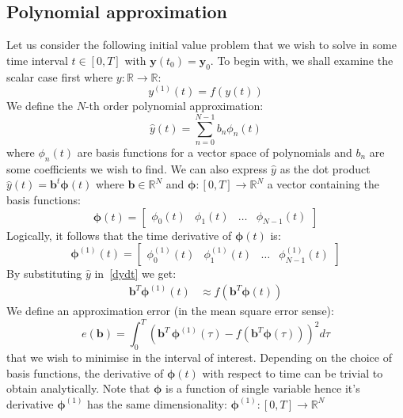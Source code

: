 \documentclass[11pt]{report}
\begin{document}
    \subsection{Polynomial approximation}
    Let us consider the following initial value problem that we wish to solve in some time interval
    $t \in [0 , T]$ with $\pmb{y} (t_0)= \pmb{y}_0$.
    To begin with, we shall examine the scalar case first where $y : \mathbb{R} \to \mathbb{R}$:
    \begin{equation}
        y^{(1)}(t) = f(y(t)) \label{dydt}
    \end{equation}
    We define the $N$-th order polynomial approximation:
    \begin{equation*}
        \hat{y}(t)=\sum_{n=0}^{N-1} b_n \phi_n(t)
    \end{equation*}
    where $ \phi_n(t) $ are basis functions for a vector space of polynomials and $b_n$ are some coefficients we wish to find.
    We can also express $\hat{y}$ as the dot product $\hat{y}(t)=  \pmb{b}^t \pmb{\phi}(t)$ where $\pmb{b} \in \mathbb{R}^N$ and
    $\pmb{\phi} : [0,T] \to \mathbb{R}^N$ a vector containing the basis functions:
    \begin{equation*}
        \pmb{\phi}(t) =
        \begin{bmatrix}
            \phi_0(t) & \phi_1(t) & \dots & \phi_{N-1}(t)
        \end{bmatrix}
    \end{equation*}
    Logically, it follows that the time derivative of $\pmb{\phi}(t)$ is:
    \begin{equation*}
        \pmb{\phi}^{(1)}(t) =
        \begin{bmatrix}
            \phi_0^{(1)}(t) & \phi_1^{(1)}(t) & \dots & \phi_{N-1}^{(1)}(t)
        \end{bmatrix}
    \end{equation*}
    By substituting $\hat{y}$ in~\eqref{dydt} we get:
    \begin{align}
        \pmb{b}^T \pmb{\phi}^{(1)}(t)   &\approx f( \pmb{b}^T \pmb{\phi}(t) ) \label{dPhidt}
    \end{align}
    We define an approximation error (in the mean square error sense):
    \begin{equation}
        \label{eq:error_wrt_B}
        e(\pmb{b}) = \int_0^T
        \left(
        \pmb{b}^T  \, \pmb{\phi}^{(1)}(\tau) - f( \pmb{b}^T \pmb{\phi}(\tau)   )
        \right)^2
        d\tau
    \end{equation}
    that we wish to minimise in the interval of interest.
    Depending on the choice of basis functions, the derivative of $\pmb{\phi}(t)$ with respect to time can be trivial
    to obtain analytically.
    Note that $\pmb{\phi}$ is a function of single variable hence it's derivative $\pmb{\phi}^{(1)}$ has the same
    dimensionality: $\pmb{\phi}^{(1)} : [0,T] \to \mathbb{R}^N$
\end{document}

